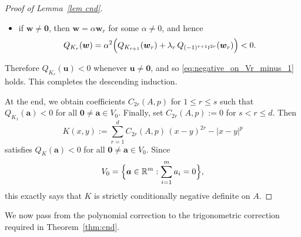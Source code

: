\documentclass[11pt]{article}
\theoremstyle{definition}
\begin{document}
\begin{proof}[Proof of Lemma~\ref{lem cnd}]
\begin{itemize}
		\item if $\boldsymbol{w}\ne \boldsymbol{0}$, then $\boldsymbol{w}=\alpha \boldsymbol{w}_r$ for some $\alpha\ne 0$, and hence
		\[
		Q_{K_r}(\boldsymbol{w})
		=
		\alpha^2\Bigl(
		Q_{K_{r+1}}(\boldsymbol{w}_r)+\lambda_r\,Q_{(-1)^{r+1}t^{2r}}(\boldsymbol{w}_r)
		\Bigr)<0.
		\]
	\end{itemize}
	Therefore $Q_{K_r}(\boldsymbol{u})<0$ whenever $\boldsymbol{u}\ne \boldsymbol{0}$, and so
	\eqref{eq:negative_on_Vr_minus_1} holds. This completes the descending induction.
	
	At the end, we obtain coefficients $C_{2r}(A,p)$ for $1\le r\le s$ such that
	\(
	Q_{K_1}(\boldsymbol{a})<0\) for all
	\(\boldsymbol{0}\ne \boldsymbol{a}\in V_0.
	\)
	Finally, set
	\(
	C_{2r}(A,p):=0\) for
	\(s<r\le d\).
	Then
	\[
	K(x,y):=\sum_{r=1}^d C_{2r}(A,p)\,(x-y)^{2r}-|x-y|^p
	\]
	satisfies
	\(
	Q_K(\boldsymbol{a})<0\)
	for all \(\boldsymbol{0}\ne \boldsymbol{a}\in V_0.\)
	Since
	\[
	V_0=\Bigl\{\boldsymbol{a}\in\mathbb R^m:\sum_{i=1}^m a_i=0\Bigr\},
	\]
	this exactly says that $K$ is strictly conditionally negative definite on $A$.
\end{proof}

We now pass from the polynomial correction to the trigonometric correction required in Theorem~\ref{thm:cnd}.
\end{document}
